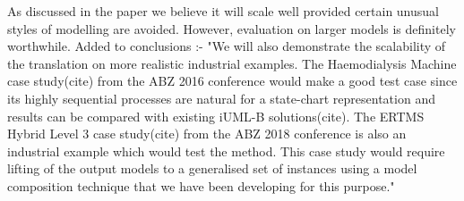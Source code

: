 \documentclass{response}
\begin{document}


\begin{comment}{Reviewer \#1}
Contribution:
Authors present an encoding scheme to be able to handle the
abstraction (and refinement) of statechart models. The contribution is
mainly focused onto the special encoding and the implementation. The
contribution is enough for a workshop paper and it could be a nice
piece of work to be shown in the workshop.
However, the approach seems not to scale well, so I would suggest the
authors evaluate their work using more complex (industrial)
verification problems.
\end{comment}

\begin{response}
  As discussed in the paper we believe it will scale well provided certain unusual styles of modelling are avoided. 
  However, evaluation on larger models is definitely worthwhile.
  Added to conclusions :- 
  "We will also demonstrate the scalability of the translation on more realistic industrial examples. The Haemodialysis Machine case study(cite) from the ABZ 2016 conference would make a good test case since its highly sequential processes are natural for a state-chart representation and results can be compared with existing iUML-B solutions(cite). The ERTMS Hybrid Level 3 case study(cite) from the ABZ 2018 conference is also an industrial example which would test the method. This case study would require lifting of the output models to a generalised set of instances using a model composition technique that we have been developing for this purpose."
\end{response}


\end{document}
